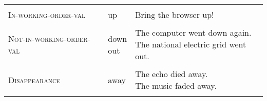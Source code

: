 \documentclass[output=paper
,modfonts
,nonflat]{langsci/langscibook}
\begin{document}
\begin{table}[!t]
{\begin{tabular}{p{3.1in}p{1in}p{6.4in}}
    \\\\ 
  \textsc{In-working-order-val}
    & up
    & Bring the browser up! 
    \\\\
  \textsc{Not-in-working-order-val}
    & \makecell[lt]{down \\ out }
    & \makecell[lt]{The computer went down again. \\ The national electric grid went out.}
    \\\\ 
  \textsc{Disappearance}
    & away
    & \makecell[lt]{The echo died away.\\ The music faded away.}
\\
\lspbottomrule
 \end{tabular}
}
\end{table}
\end{document}
